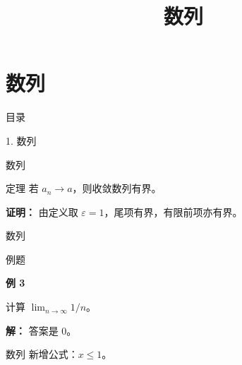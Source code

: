 \documentclass[aspectratio=169,10pt,fontset=fandol]{ctexbeamer}
\title{数列}
\begin{document}
\section{数列}
\begin{frame}[t,fragile]{目录}
\normalsize
{\color{blue}\normalsize 1. 数列\par}\vspace{0.3em}
\end{frame}
\begin{frame}[t,fragile]{数列}
\normalsize
\begin{block}{定理}
{\normalsize
若 $a_n\to a$，则收敛数列有界。
}
\end{block}
\pause
{\normalsize
\textbf{证明：}
由定义取 $\varepsilon=1$，尾项有界，有限前项亦有界。
}
\end{frame}
\begin{frame}[t,fragile]{数列}
\normalsize
\begin{block}{例题}
{\normalsize
\textbf{例 3}\par
计算 $\lim_{n\to\infty}1/n$。
}
\end{block}
\pause
{\normalsize
\textbf{解：}
答案是 $0$。
}
\end{frame}
\begin{frame}[t,fragile]{数列}
\normalsize
\normalsize
新增公式：$x\leqslant 1$。
\end{frame}
\end{document}
